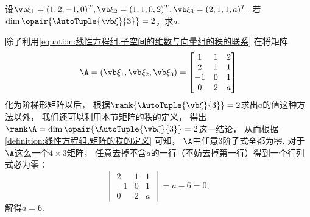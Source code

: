 \begin{example}
设\(\a_1=(1,2,-1,0)^T,\a_2=(1,1,0,2)^T,\a_3=(2,1,1,a)^T\).
若\(\dim\opair{\AutoTuple{\a}{3}}=2\)，求\(a\).
\begin{solution}
除了利用\cref{equation:线性方程组.子空间的维数与向量组的秩的联系} 在将矩阵\[
	\A = (\a_1,\a_2,\a_3)
	= \begin{bmatrix}
		1 & 1 & 2 \\
		2 & 1 & 1 \\
		-1 & 0 & 1 \\
		0 & 2 & a
	\end{bmatrix}
\]化为阶梯形矩阵以后，
根据\(\rank\{\AutoTuple{\a}{3}\}=2\)求出\(a\)的值这种方法以外，
我们还可以利用本节\hyperref[definition:线性方程组.矩阵的秩的定义]{矩阵的秩的定义}，
得出\(\rank\A=\dim\opair{\AutoTuple{\a}{3}}=2\)这一结论，
从而根据\cref{definition:线性方程组.矩阵的秩的定义} 可知，
\(\A\)中任意3阶子式全都为零.
对于\(\A\)这么一个\(4\times3\)矩阵，
任意去掉不含\(a\)的一行（不妨去掉第一行）得到一个行列式必为零：\[
	\begin{vmatrix}
	2 & 1 & 1 \\
	-1 & 0 & 1 \\
	0 & 2 & a
	\end{vmatrix}
	= a - 6 = 0,
\]
解得\(a = 6\).
\end{solution}
\end{example}
